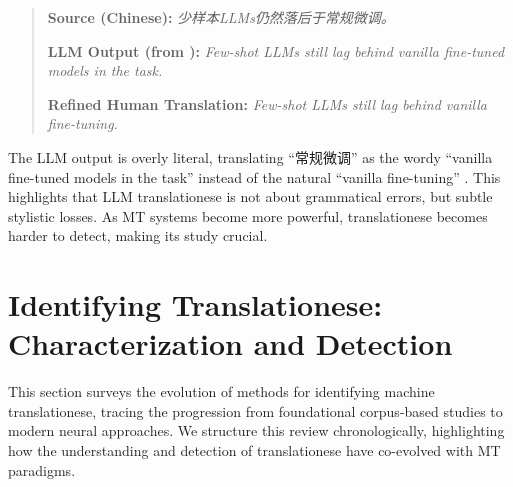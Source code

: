 \documentclass[11pt,a4paper]{article}
\begin{document}
\begin{quote}
\textbf{Source (Chinese):} \textit{少样本LLMs仍然落后于常规微调。}

\textbf{LLM Output (from \citet{li2025lost}):} \textit{Few-shot LLMs still lag behind vanilla fine-tuned models in the task.}

\textbf{Refined Human Translation:} \textit{Few-shot LLMs still lag behind vanilla fine-tuning.}
\end{quote}

The LLM output is overly literal, translating ``常规微调'' as the wordy ``vanilla fine-tuned models in the task'' instead of the natural ``vanilla fine-tuning'' \cite{li2025lost}. This highlights that LLM translationese is not about grammatical errors, but subtle stylistic losses. As MT systems become more powerful, translationese becomes harder to detect, making its study crucial.

\section{Identifying Translationese: Characterization and Detection}

This section surveys the evolution of methods for identifying machine translationese, tracing the progression from foundational corpus-based studies to modern neural approaches. We structure this review chronologically, highlighting how the understanding and detection of translationese have co-evolved with MT paradigms.
\end{document}
